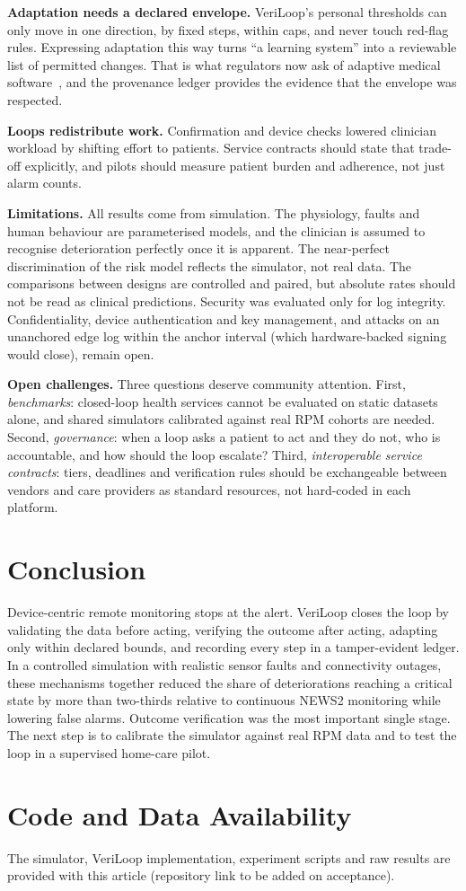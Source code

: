 \documentclass[journal]{IEEEtran}
\begin{document}
\textbf{Adaptation needs a declared envelope.} VeriLoop's personal thresholds can only move in one direction, by
fixed steps, within caps, and never touch red-flag rules. Expressing adaptation this way turns ``a learning system'' into
a reviewable list of permitted changes. That is what regulators now ask of adaptive medical software~\cite{fda2021},
and the provenance ledger provides the evidence that the envelope was respected.

\textbf{Loops redistribute work.} Confirmation and device checks lowered clinician workload by shifting effort to
patients. Service contracts should state that trade-off explicitly, and pilots should measure patient burden and
adherence, not just alarm counts.

\textbf{Limitations.} All results come from simulation. The physiology, faults and human behaviour are parameterised
models, and the clinician is assumed to recognise deterioration perfectly once it is apparent. The near-perfect
discrimination of the risk model reflects the simulator, not real data. The comparisons between designs are controlled
and paired, but absolute rates should not be read as clinical predictions. Security was evaluated only for log
integrity. Confidentiality, device authentication and key management, and attacks on an unanchored edge log within the
anchor interval (which hardware-backed signing would close), remain open.

\textbf{Open challenges.} Three questions deserve community attention. First, \emph{benchmarks}: closed-loop health
services cannot be evaluated on static datasets alone, and shared simulators calibrated against real RPM cohorts are
needed. Second, \emph{governance}: when a loop asks a patient to act and they do not, who is accountable, and how
should the loop escalate? Third, \emph{interoperable service contracts}: tiers, deadlines and verification rules
should be exchangeable between vendors and care providers as standard resources, not hard-coded in each platform.


\section*{Conclusion}


Device-centric remote monitoring stops at the alert. VeriLoop closes the loop by validating the data before acting,
verifying the outcome after acting, adapting only within declared bounds, and recording every step in a tamper-evident
ledger. In a controlled simulation with realistic sensor faults and connectivity outages, these mechanisms together
reduced the share of deteriorations reaching a critical state by more than two-thirds relative to continuous NEWS2
monitoring while lowering false alarms. Outcome verification was the most important single stage. The next step is to
calibrate the simulator against real RPM data and to test the loop in a supervised home-care pilot.


\section*{Code and Data Availability}
The simulator, VeriLoop implementation, experiment scripts and raw results are provided with this article
(repository link to be added on acceptance).



\end{document}
